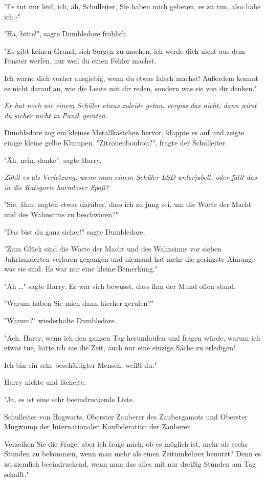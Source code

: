 {"Es tut mir leid, ich, äh, Schulleiter, Sie haben mich gebeten, es zu tun, also habe ich -"

"Ha, bitte!", sagte Dumbledore fröhlich.

"Es gibt keinen Grund, sich Sorgen zu machen, ich werde dich nicht aus dem Fenster werfen, nur weil du einen Fehler machst.

Ich warne dich vorher ausgiebig, wenn du etwas falsch machst! Außerdem kommt es nicht darauf an, wie die Leute mit dir reden, sondern was sie von dir denken."

\emph{Er hat noch nie einem Schüler etwas zuleide getan, vergiss das nicht, dann wirst du sicher nicht in Panik geraten.}

Dumbledore zog ein kleines Metallkästchen hervor, klappte es auf und zeigte einige kleine gelbe Klumpen. "Zitronenbonbon?", fragte der Schulleiter.

"Äh, nein, danke", sagte Harry.

\emph{Zählt es als Verletzung, wenn man einem Schüler LSD unterjubelt, oder fällt das in die Kategorie harmloser Spaß?}

"Sie, ähm, sagten etwas darüber, dass ich zu jung sei, um die Worte der Macht und des Wahnsinns zu beschwören?"

"Das bist du ganz sicher!" sagte Dumbledore.

"Zum Glück sind die Worte der Macht und des Wahnsinns vor sieben Jahrhunderten verloren gegangen und niemand hat mehr die geringste Ahnung, was sie sind. Es war nur eine kleine Bemerkung."

"Ah …" sagte Harry. Er war sich bewusst, dass ihm der Mund offen stand.

"Warum haben Sie mich dann hierher gerufen?"

"Warum?" wiederholte Dumbledore.

"Ach, Harry, wenn ich den ganzen Tag herumlaufen und fragen würde, warum ich etwas tue, hätte ich nie die Zeit, auch nur eine einzige Sache zu erledigen!

Ich bin ein sehr beschäftigter Mensch, weißt du."

Harry nickte und lächelte.

"Ja, es ist eine sehr beeindruckende Liste.

Schulleiter von Hogwarts, Oberster Zauberer des Zaubergamots und Oberster Mugwump der Internationalen Konföderation der Zauberer.

Verzeihen Sie die Frage, aber ich frage mich, ob es möglich ist, mehr als sechs Stunden zu bekommen, wenn man mehr als einen Zeitumkehrer benutzt? Denn es ist ziemlich beeindruckend, wenn man das alles mit nur dreißig Stunden am Tag schafft."

}
